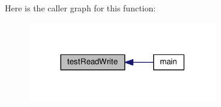 Here is the caller graph for this function\-:\nopagebreak
\begin{figure}[H]
\begin{center}
\leavevmode
\includegraphics[width=234pt]{data-pool-block-manager-test_8c_a75323f97b259a6284370855087fb48ff_icgraph}
\end{center}
\end{figure}


